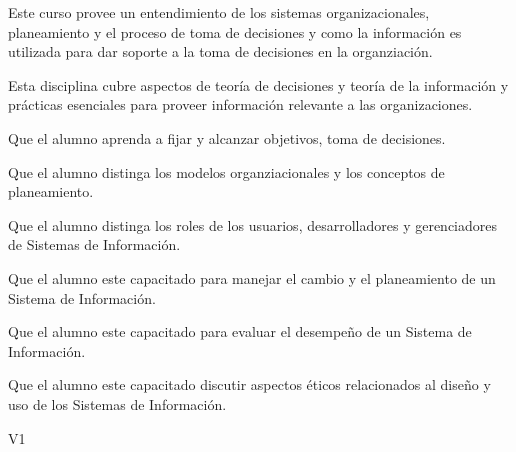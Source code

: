 \begin{syllabus}


\begin{justification}
   Este curso provee un entendimiento de los sistemas organizacionales, planeamiento y el proceso de toma de decisiones y como la información es utilizada para dar soporte a la toma de decisiones en la organziación.
   
   Esta disciplina cubre aspectos de teoría de decisiones y teoría de la información y prácticas esenciales para proveer información relevante a las organizaciones.
   \end{justification}
   
   \begin{goals}
   \item Que el alumno aprenda a fijar y alcanzar objetivos, toma de decisiones.
   \item Que el alumno distinga los modelos organziacionales y los conceptos de planeamiento.
   \item Que el alumno distinga los roles de los usuarios, desarrolladores y gerenciadores de Sistemas de Información.
   \item Que el alumno este capacitado para manejar el cambio y el planeamiento de un Sistema de Información.
   \item Que el alumno este capacitado para evaluar el desempeño de un Sistema de Información.
   \item Que el alumno este capacitado discutir aspectos éticos relacionados al diseño y uso de los Sistemas de Información.
   \end{goals}
   
   \begin{outcomes}{V1}
      \item {}
      \item {}
      \item {}
      \item {}
      \item {}
      \item {}
      \item {}
      \item {}
   \end{outcomes}
   

\end{syllabus}
